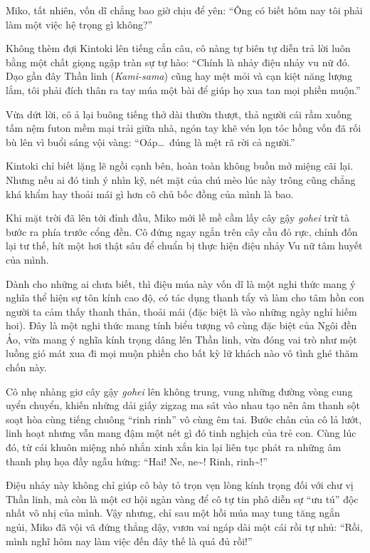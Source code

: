 \documentclass[../main.tex]{subfiles}
\begin{document}
Miko, tất nhiên, vốn dĩ chẳng bao giờ chịu để yên: ``Ông có biết hôm nay tôi phải làm một việc hệ trọng gì không?''

Không thèm đợi Kintoki lên tiếng cắn câu, cô nàng tự biên tự diễn trả lời luôn bằng một chất giọng ngập tràn sự tự hào: ``Chính là nhảy điệu nhảy vu nữ đó. Dạo gần đây Thần linh (\textit{Kami-sama}) cũng hay mệt mỏi và cạn kiệt năng lượng lắm, tôi phải đích thân ra tay múa một bài để giúp họ xua tan mọi phiền muộn.''

Vừa dứt lời, cô ả lại buông tiếng thở dài thườn thượt, thả người cái rầm xuống tấm nệm futon mềm mại trải giữa nhà, ngón tay khẽ vén lọn tóc hồng vốn đã rối bù lên vì buổi sáng vội vàng: ``Oáp\dots\ đúng là mệt rã rời cả người.''

Kintoki chỉ biết lặng lẽ ngồi cạnh bên, hoàn toàn không buồn mở miệng cãi lại. Nhưng nếu ai đó tinh ý nhìn kỹ, nét mặt của chú mèo lúc này trông cũng chẳng khá khẩm hay thoải mái gì hơn cô chủ bốc đồng của mình là bao.

\ct

Khi mặt trời đã lên tới đỉnh đầu, Miko mới lề mề cầm lấy cây gậy \textit{gohei} trừ tà bước ra phía trước cổng đền. Cô đứng ngay ngắn trên cây cầu đỏ rực, chỉnh đốn lại tư thế, hít một hơi thật sâu để chuẩn bị thực hiện điệu nhảy Vu nữ tâm huyết của mình.

Dành cho những ai chưa biết, thì điệu múa này vốn dĩ là một nghi thức mang ý nghĩa thể hiện sự tôn kính cao độ, có tác dụng thanh tẩy và làm cho tâm hồn con người ta cảm thấy thanh thản, thoải mái (đặc biệt là vào những ngày nghỉ hiếm hoi). Đây là một nghi thức mang tính biểu tượng vô cùng đặc biệt của Ngôi đền Ảo, vừa mang ý nghĩa kính trọng dâng lên Thần linh, vừa đóng vai trò như một luồng gió mát xua đi mọi muộn phiền cho bất kỳ lữ khách nào vô tình ghé thăm chốn này.


Cô nhẹ nhàng giơ cây gậy \textit{gohei} lên không trung, vung những đường vòng cung uyển chuyển, khiến những dải giấy zigzag ma sát vào nhau tạo nên âm thanh sột soạt hòa cùng tiếng chuông ``rinh rinh'' vô cùng êm tai. Bước chân của cô lả lướt, linh hoạt nhưng vẫn mang đậm một nét gì đó tinh nghịch của trẻ con. Cùng lúc đó, từ cái khuôn miệng nhỏ nhắn xinh xắn kia lại liên tục phát ra những âm thanh phụ họa đầy ngẫu hứng: ``Hai! Ne, ne\~{}! Rinh, rinh\~{}!''

Điệu nhảy này không chỉ giúp cô bày tỏ trọn vẹn lòng kính trọng đối với chư vị Thần linh, mà còn là một cơ hội ngàn vàng để cô tự tin phô diễn sự ``ưu tú'' độc nhất vô nhị của mình. Vậy nhưng, chỉ sau một hồi múa may tung tăng ngắn ngủi, Miko đã vội vã đứng thẳng dậy, vươn vai ngáp dài một cái rồi tự nhủ: ``Rồi, mình nghĩ hôm nay làm việc đến đây thế là quá đủ rồi!''
\end{document}

